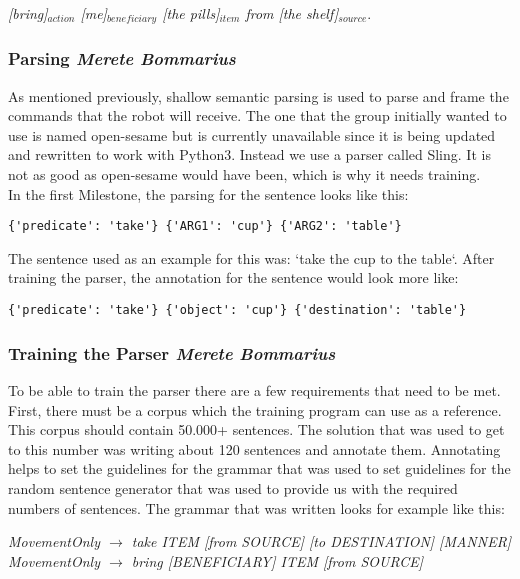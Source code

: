 \documentclass[main.tex]{subfiles}
\begin{document}
            \textit{ [bring]$_{action}$  [me]$_{beneficiary}$ [the pills]$_{item}$ from [the shelf]$_{source}.$}
        \subsubsection{Parsing \small{\textit{Merete Bommarius}}}     
            As mentioned previously, shallow semantic parsing is used to parse and frame the commands that the robot will receive. The one that the group initially wanted to use is named open-sesame but is currently unavailable since it is being updated and rewritten to work with Python3. Instead we use a parser called Sling. It is not as good as open-sesame would have been, which is why it needs training.\\ 
            In the first Milestone, the parsing for the sentence looks like this:
    
\begin{lstlisting}
{'predicate': 'take'} {'ARG1': 'cup'} {'ARG2': 'table'}
\end{lstlisting}
            
            The sentence used as an example for this was: ‘take the cup to the table‘. After training the parser, the annotation for the sentence would look more like:
            
\begin{lstlisting}
{'predicate': 'take'} {'object': 'cup'} {'destination': 'table'}
\end{lstlisting}
            
        \subsubsection{Training the Parser \small{\textit{Merete Bommarius}}}
            To be able to train the parser there are a few requirements that need to be met. First, there must be a corpus which the training program can use as a reference. This corpus should contain 50.000+ sentences. The solution that was used to get to this number was writing about 120 sentences and annotate them. Annotating helps to set the guidelines for the grammar that was used to set guidelines for the random sentence generator that was used to provide us with the required numbers of sentences.
            The grammar that was written looks for example like this:
            
            
\textit{MovementOnly $\rightarrow$ take ITEM [from SOURCE] [to DESTINATION] [MANNER]\\
                MovementOnly $\rightarrow$ bring [BENEFICIARY] ITEM [from SOURCE]}
                
\end{document}
